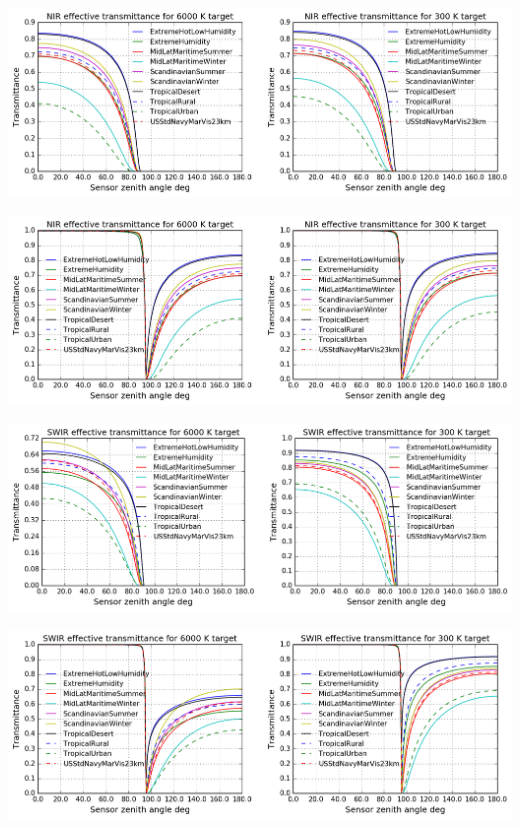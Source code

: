\documentclass{workpackage}
\begin{document}
\begin{center}
\includegraphics{./pic/Analyse-Standard-Atmospheres_44_2.png}
\end{center}

\begin{center}
\includegraphics{./pic/Analyse-Standard-Atmospheres_44_3.png}
\end{center}

\begin{center}
\includegraphics{./pic/Analyse-Standard-Atmospheres_44_4.png}
\end{center}

\begin{center}
\includegraphics{./pic/Analyse-Standard-Atmospheres_44_5.png}
\end{center}
\end{document}
